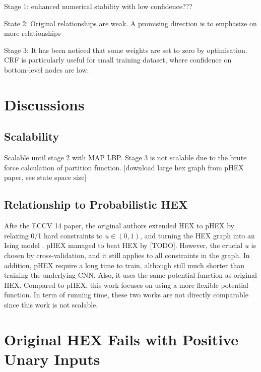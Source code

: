 \documentclass[11pt,a4paper]{article}
\begin{document}
Stage 1: enhanced numerical stability with low confidence???

State 2: Original relationships are weak. A promising direction is to emphasize on more relationships

Stage 3: It has been noticed that some weights are set to zero by optimisation. CRF is particularly useful for small training dataset, where confidence on bottom-level nodes are low.

\clearpage
\section{Discussions}
\subsection{Scalability}

Scalable until stage 2 with MAP LBP. Stage 3 is not scalable due to the brute force calculation of partition function. [download large hex graph from pHEX paper, see state space size]

\subsection{Relationship to Probabilistic HEX}

Afte the ECCV 14 paper, the original authors extended HEX to pHEX by relaxing 0/1 hard constraints to $u\in(0,1)$, and turning the HEX graph into an Ising model \cite{ding2015probabilistic}. pHEX managed to beat HEX by [TODO]. However, the crucial $u$ is chosen by cross-validation, and it still applies to all constraints in the graph. In addition, pHEX require a long time to train, although still much shorter than training the underlying CNN. Also, it uses the same potential function as original HEX. Compared to pHEX, this work focuses on using a more flexible potential function. In term of running time, these two works are not directly comparable since this work is not scalable.

\clearpage
\appendix
\section{Original HEX Fails with Positive Unary Inputs}
\label{sec:fail}
\end{document}
